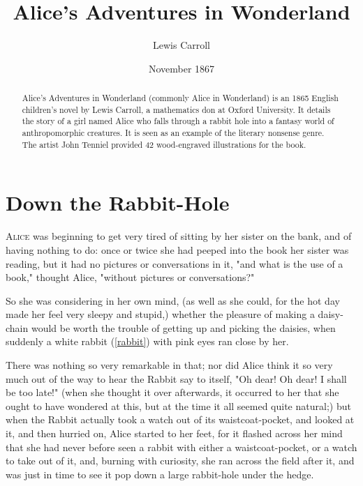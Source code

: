 \documentclass[aps,prb,amsmath,twocolumn,amssymb,titlepage]{revtex4-2}
\begin{document}

\title{Alice's Adventures in Wonderland}
\author{Lewis Carroll}
\date{November 1867}


\begin{abstract}
  Alice's Adventures in Wonderland (commonly Alice in Wonderland) is an 1865 English children's novel by Lewis Carroll, a mathematics don at Oxford University. It details the story of a girl named Alice who falls through a rabbit hole into a fantasy world of anthropomorphic creatures. It is seen as an example of the literary nonsense genre. The artist John Tenniel provided 42 wood-engraved illustrations for the book.
\end{abstract}


\maketitle

\section{Down the Rabbit-Hole}

\textsc{Alice} was beginning to get very tired of sitting by her sister on the bank, and of having nothing to do: once or twice she had peeped into the book her sister was reading, but it had no pictures or conversations in it, "and what is the use of a book," thought Alice, "without pictures or conversations?"

So she was considering in her own mind, (as well as she could, for the hot day made her feel very sleepy and stupid,) whether the pleasure of making a daisy-chain would be worth the trouble of getting up and picking the daisies, when suddenly a white rabbit (\cref{rabbit}) with pink eyes ran close by her.

There was nothing so very remarkable in that; nor did Alice think it so very much out of the way to hear the Rabbit say to itself, "Oh dear! Oh dear! I shall be too late!" (when she thought it over afterwards, it occurred to her that she ought to have wondered at this, but at the time it all seemed quite natural;) but when the Rabbit actually took a watch out of its waistcoat-pocket, and looked at it, and then hurried on, Alice started to her feet, for it flashed across her mind that she had never before seen a rabbit with either a waistcoat-pocket, or a watch to take out of it, and, burning with curiosity, she ran across the field after it, and was just in time to see it pop down a large rabbit-hole under the hedge.
\end{document}
